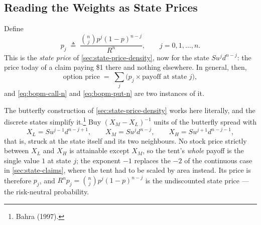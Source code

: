 \subsection{Reading the Weights as State Prices}


Define
\begin{equation}
	p_{j} \;\triangleq\; \frac{\binom{n}{j}p^{j}(1-p)^{n-j}}{R^{n}} ,
	\qquad j=0,1,\ldots,n .
	\label{eq:bopm-state-price}
\end{equation}
This is the \emph{state price} of \autoref{sec:state-price-density}, now for the state $Su^{j}d^{n-j}$: the price today of a claim paying \$1 there and nothing elsewhere.
In general, then,
\[
	\text{option price} \;=\; \sum_{j}\bigl(p_{j}\times\text{payoff at state } j\bigr) ,
\]
and \eqref{eq:bopm-call-n} and \eqref{eq:bopm-put-n} are two instances of it.

\begin{note}
	The butterfly construction of \autoref{sec:state-price-density} works here literally, and the discrete states simplify it.\footnote{Bahra (1997).}
	Buy $(X_{M}-X_{L})^{-1}$ units of the butterfly spread with
	\[
		X_{L}=Su^{j-1}d^{n-j+1} , \qquad
		X_{M}=Su^{j}d^{n-j} , \qquad
		X_{H}=Su^{j+1}d^{n-j-1} ,
	\]
	\suppstart
	that is, struck at the state itself and its two neighbours.
	No stock price strictly between $X_{L}$ and $X_{H}$ is attainable except $X_{M}$, so the tent's \emph{whole} payoff is the single value $1$ at state $j$; the exponent $-1$ replaces the $-2$ of the continuous case in \autoref{sec:state-claims}, where the tent had to be scaled by area instead.
	\suppend
	Its price is therefore $p_{j}$, and $R^{n}p_{j}=\binom{n}{j}p^{j}(1-p)^{n-j}$ is the undiscounted state price --- the risk-neutral probability.
\end{note}

